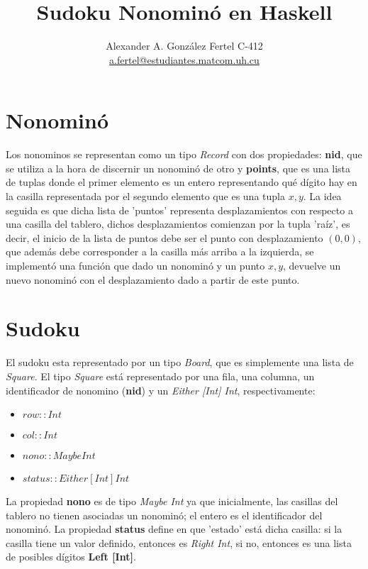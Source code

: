 \documentclass[a4paper, 10pt]{article}
\title{Sudoku Nonominó en Haskell}
\author{Alexander A. González Fertel C-412\\
		\href{mailto:a.fertel@estudiantes.matcom.uh.cu}{a.fertel@estudiantes.matcom.uh.cu}}
\date{}
\begin{document}
	\maketitle

	\section{Nonominó}
	Los nonominos se representan como un tipo {\itshape Record} con dos propiedades: {\bfseries nid},
	que se utiliza a la hora de discernir un nonominó de otro y {\bfseries points}, que es una
	lista de tuplas donde el primer elemento es un entero representando qué dígito hay en la casilla
	representada por el segundo elemento que es una tupla $x, y$. La idea seguida
	es que dicha lista de 'puntos' representa desplazamientos con respecto a una casilla del tablero,
	dichos desplazamientos comienzan por la tupla 'raíz', es decir, el inicio de la lista de puntos
	debe ser el punto con desplazamiento $(0, 0)$, que además debe corresponder a la casilla más arriba
	a la izquierda,
	se implementó una función que dado un nonominó y un punto $x, y$, devuelve un nuevo nonominó
	con el desplazamiento dado a partir de este punto. 

	\section{Sudoku}
	El sudoku esta representado por un tipo {\itshape Board}, que es simplemente una lista de
	{\itshape Square}. El tipo {\itshape Square} está representado por una fila, una columna,
	un identificador de nonomino ({\bfseries nid}) y un {\itshape Either [Int] Int}, respectivamente:
	
	\begin{itemize}
		\item $row :: Int$	
		\item $col :: Int$	
		\item $nono :: Maybe Int$	
		\item $status :: Either [Int] Int$	
	\end{itemize}

	La propiedad {\bfseries nono} es de tipo {\itshape Maybe Int} ya que inicialmente, las
	casillas del tablero no tienen asociadas un nonominó; el entero es el identificador del nonominó.
	La propiedad {\bfseries status} define en que 'estado' está dicha casilla: si la casilla
	tiene un valor definido, entonces es {\itshape Right Int}, si no, entonces es una lista de
	posibles dígitos {\bfseries Left [Int]}.
\end{document}
